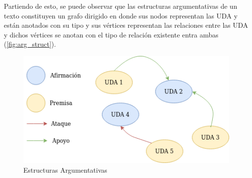 Partiendo de esto, se puede observar que las estructuras argumentativas de un texto constituyen un grafo dirigido 
en donde sus nodos representan las UDA y están anotados con su tipo y sus vértices representan las 
relaciones entre las UDA y dichos vértices se anotan con el tipo de relación existente entra ambas (\ref{fig:arg_struct}).

\begin{figure}[h!]
	\begin{center}
		\begin{center}
			\includegraphics[scale=.7]{Graphics/Estructuras_argumentativas.png}
        \end{center}
	    \caption{Estructuras Argumentativas}
	\end{center}
\end{figure}\label{fig:arg_struct}
